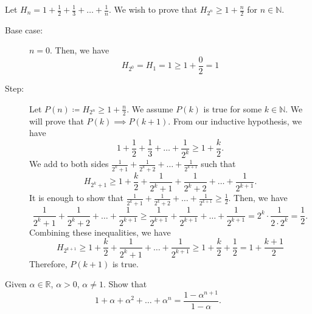 \documentclass[a4paper]{article}
\begin{document}
\begin{eg}
	Let \( H_n = 1 + \frac{1}{2} + \frac{1}{3} + \ldots  + \frac{1}{n} \). We wish to prove that \( H_{2^n} \ge  1 + \frac{n}{2} \) for \( n \in \mathbb{N} \).
	\begin{description}
		\item[Base case:] \( n = 0 \). Then, we have \[
				H_{2^0} = H_1 = 1 \ge 1 + \frac{0}{2} = 1 
			\]
		\item[Step:] Let \( P(n) \coloneq H_{2^n} \ge 1 + \frac{n}{2} \). We assume \( P(k) \) is true for some \( k \in \mathbb{N} \). We will prove that \( P(k) \implies P(k+1) \). From our inductive hypothesis, we have \[
			1 + \frac{1}{2} + \frac{1}{3} + \ldots  + \frac{1}{2^k} \ge 1 + \frac{k}{2}
		.\] We add to both sides \(\frac{1}{2^k+1} + \frac{1}{2^k+2} + \ldots + \frac{1}{2^{k+1}}\) such that \[
			H_{2^k+1} \ge  1 + \frac{k}{2} + \frac{1}{2^k+1} + \frac{1}{2^k+2} + \ldots + \frac{1}{2^{k+1}}
		.\] It is enough to show that \( \frac{1}{2^k+1} + \frac{1}{2^k+2} + \ldots + \frac{1}{2^{k+1}} \ge \frac{1}{2} \). Then, we have \[
			\frac{1}{2^k+1} + \frac{1}{2^k+2} + \ldots + \frac{1}{2^{k+1}} \ge \frac{1}{2^{k+1}} + \frac{1}{2^{k+1}} + \ldots + \frac{1}{2^{k+1}} = 2^k \cdot  \frac{1}{2\cdot 2^k} = \frac{1}{2} 
		.\] Combining these inequalities, we have \[
			H_{2^{k+1}} \ge 1 + \frac{k}{2} + \frac{1}{2^k+1} + \ldots + \frac{1}{2^{k+1}} \ge 1 + \frac{k}{2} + \frac{1}{2} = 1 + \frac{k+1}{2} 
		\] Therefore, \( P(k+1) \) is true.
	\end{description}
\end{eg}


\begin{eg}
	Given \( \alpha  \in \mathbb{R} \), \( \alpha  >  0\), \( \alpha  \neq  1 \). Show that \[
		1 + \alpha  + \alpha ^2 + \ldots + \alpha ^n = \frac{1-\alpha ^{n+1}}{1 - \alpha }
	.\] 
\end{eg}
\end{document}
